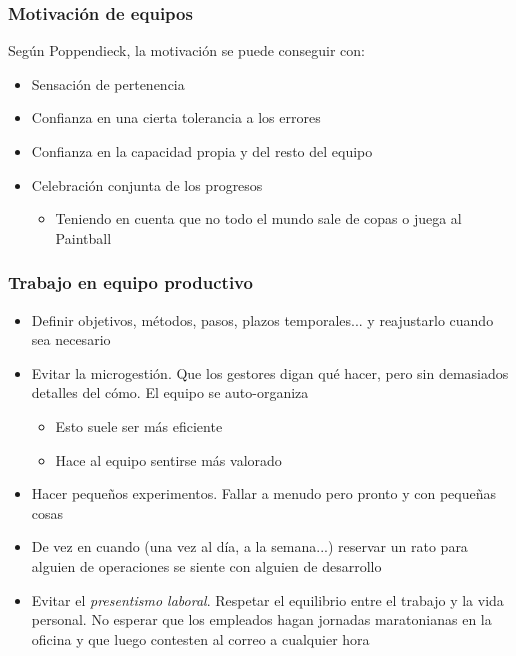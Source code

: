 \documentclass[ucs]{beamer}
\begin{document}
\begin{frame}[fragile]
\frametitle{Motivación de equipos}
Según Poppendieck, la motivación se puede conseguir con:

\begin{itemize}
\item
Sensación de pertenencia
\item
Confianza en una cierta tolerancia a los errores
\item
Confianza en la capacidad propia y del resto del equipo
\item
Celebración conjunta de los progresos

\begin{itemize}
\item
Teniendo en cuenta que no todo el mundo sale de copas o juega
al Paintball
\end{itemize}
\end{itemize}
\end{frame}


\begin{frame}[fragile]
\frametitle{Trabajo en equipo productivo}
\begin{itemize}
\item
Definir objetivos, métodos, pasos, plazos temporales... y reajustarlo cuando sea necesario

\item
Evitar la microgestión.
Que los gestores digan qué hacer, pero sin demasiados detalles del cómo. 
El equipo se auto-organiza

\begin{itemize}
\item
Esto suele ser más eficiente
\item
Hace al equipo sentirse más valorado
\end{itemize}
\end{itemize}
\end{frame}

\begin{frame}[fragile]
\begin{itemize}
\item
Hacer pequeños experimentos. Fallar a menudo pero pronto y con pequeñas cosas

\item
De vez en cuando (una vez al día, a la semana...) reservar un rato para alguien de operaciones
se siente con alguien de desarrollo

\item
Evitar el \emph{presentismo laboral}. 
Respetar el equilibrio entre el trabajo y la vida personal.
No esperar que los empleados hagan jornadas maratonianas
en la oficina y que luego contesten al correo a cualquier hora

\end{itemize}
\end{frame}
\end{document}
